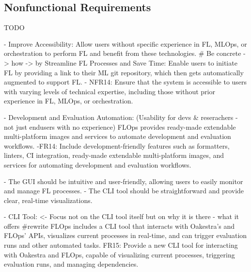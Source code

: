 \subsection{Nonfunctional Requirements}
TODO

\begin{itemize}
    
    - Improve Accessibility:
        Allow users without specific experience in FL, MLOps, or orchestration to perform FL and benefit from these technologies.
        # Be concrete -> how     
        -> by Streamline FL Processes and Save Time:
        Enable users to initiate FL by providing a link to their ML git repository, which then gets automatically augmented to support FL.
        - NFR14: Ensure that the system is accessible to users with varying levels of technical expertise, including those without prior experience in FL, MLOps, or orchestration.

    - Development and Evaluation Automation: (Usability for devs & reserachers - not just endusers with no experience)
        FLOps provides ready-made extendable multi-platform images and services to automate development and evaluation workflows.    
    -FR14: Include development-friendly features such as formatters, linters, CI integration, ready-made extendable multi-platform images, and services for automating development and evaluation workflows.

    - The GUI should be intuitive and user-friendly, allowing users to easily monitor and manage FL processes.
    - The CLI tool should be straightforward and provide clear, real-time visualizations.

    - CLI Tool: <- Focus not on the CLI tool itself but on why it is there - what it offers #rewrite
        FLOps includes a CLI tool that interacts with Oakestra’s and FLOps’ APIs, visualizes current processes in real-time, and can trigger evaluation runs and other automated tasks.
        FR15: Provide a new CLI tool for interacting with Oakestra and FLOps, capable of visualizing current processes, triggering evaluation runs, and managing dependencies.


\end{itemize}
